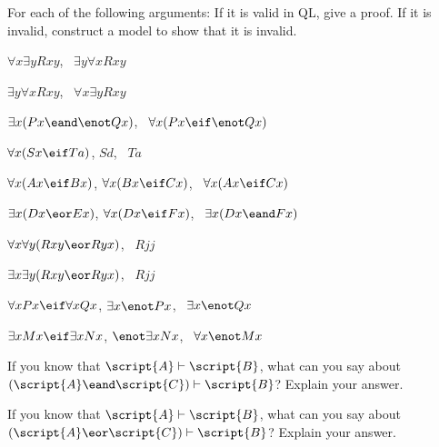 \solutions
\problempart
\label{pr.QLvalidornot}
For each of the following arguments: If it is valid in QL, give a proof. If it is invalid, construct a model to show that it is invalid.
\begin{earg}
\item $\forall x\exists y Rxy$, \therefore\ $\exists y\forall x Rxy$
\item $\exists y\forall x Rxy$, \therefore\ $\forall x\exists y Rxy$
\item $\exists x(Px \eand \enot Qx)$, \therefore\ $\forall x(Px \eif \enot Qx)$
\item $\forall x(Sx \eif Ta)$, $Sd$, \therefore\ $Ta$
\item $\forall x(Ax\eif Bx)$, $\forall x(Bx \eif Cx)$, \therefore\ $\forall x(Ax \eif Cx)$
\item $\exists x(Dx \eor Ex)$, $\forall x(Dx \eif Fx)$, \therefore\ $\exists x(Dx \eand Fx)$
\item $\forall x\forall y(Rxy \eor Ryx)$, \therefore\ $Rjj$
\item $\exists x\exists y(Rxy \eor Ryx)$, \therefore\ $Rjj$
\item $\forall x Px \eif \forall x Qx$, $\exists x \enot Px$, \therefore\ $\exists x \enot Qx$
\item $\exists x Mx \eif \exists x Nx$, $\enot \exists x Nx$, \therefore\ $\forall x \enot Mx$
\end{earg}






\problempart
\begin{earg}
\item If you know that $\script{A}\vdash\script{B}$, what can you say about $(\script{A}\eand\script{C})\vdash\script{B}$? Explain your answer.
\item If you know that $\script{A}\vdash\script{B}$, what can you say about $(\script{A}\eor\script{C})\vdash\script{B}$? Explain your answer.
\end{earg}



